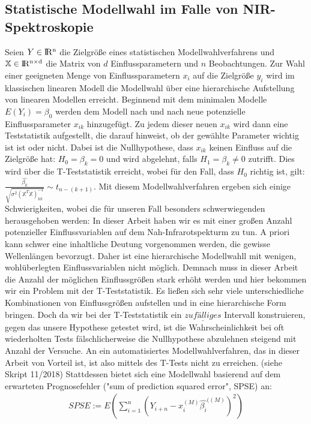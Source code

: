 	\subsection{Statistische Modellwahl im Falle von NIR-Spektroskopie}
	\label{ssec:mlr}
	Seien $Y\in \rm I\!R^{n}$ die Zielgröße eines statistischen Modellwahlverfahrens und $\mathbb{X} \in \rm I\!R^{n \times d}$ die Matrix von $d$ Einflussparametern und $n$ Beobachtungen. 
	Zur Wahl einer geeigneten Menge von Einflussparametern $x_i$ auf die Zielgröße $y_i$  wird im klassischen linearen Modell die Modellwahl über eine hierarchische Aufstellung von linearen Modellen erreicht. Beginnend mit dem minimalen Modelle $E(Y_i) = \beta_0$ werden dem Modell nach und nach neue potenzielle Einflussparameter $x_{ik}$ hinzugefügt. Zu jedem dieser neuen $x_{ik}$ wird dann eine Teststatistik aufgestellt, die darauf hinweist, ob der gewählte Parameter wichtig ist ist oder nicht. Dabei ist die Nullhypothese, dass $x_{ik}$ keinen Einfluss auf die Zielgröße hat: $ H_0 = \beta_k = 0$ und wird abgelehnt, falls $H_1 = \beta_k \neq 0$ zutrifft. 
	Dies wird über die T-Teststatistik erreicht,  wobei für den Fall, dass $H_0$ richtig ist, gilt: $\frac{\hat{\beta_k}}{\sqrt{\sigma^2(\mathbb{X}^T\mathbb{X})^{-1}_{kk}}} \sim t_{n-(k+1)}$.
	Mit diesem Modellwahlverfahren ergeben sich einige Schwierigkeiten, wobei die für unseren Fall besonders schwerwiegenden herausgehoben werden: In dieser Arbeit haben wir es mit einer großen Anzahl potenzieller Einflussvariablen auf dem Nah-Infrarotspekturm zu tun. A priori kann schwer eine inhaltliche Deutung vorgenommen werden, die gewisse Wellenlängen bevorzugt. Daher ist eine hierarchische Modellwahll mit wenigen, wohlüberlegten Einflussvariablen nicht möglich. Demnach muss in dieser Arbeit die Anzahl der möglichen Einflussgrößen stark erhöht werden und hier bekommen wir ein Problem mit der T-Teststatistik. Es ließen sich sehr viele unterschiedliche Kombinationen von Einflussgrößen aufstellen und in eine hierarchische Form bringen. Doch da wir bei der T-Teststatistik ein $\underline{zufälliges}$ Intervall konstruieren, gegen das unsere Hypothese getestet wird, ist die Wahrscheinlichkeit bei oft wiederholten Tests fälschlicherweise die Nullhypothese abzulehnen steigend mit Anzahl der Versuche. An ein automatisiertes Modellwahlverfahren, das in dieser Arbeit von Vorteil ist, ist also mittels des T-Tests nicht zu erreichen. (siehe Skript 11/2018)
	Stattdessen bietet sich eine Modellwahl basierend auf dem erwarteten Prognosefehler ("sum of prediction squared error", SPSE) an: 
	\begin{align}
		SPSE := E(\sum_{i=1}^{n} (Y_{i+n} - x_{i}^{(M)}\hat{\beta_i}^{((M)})^2)
	\end{align}
	
